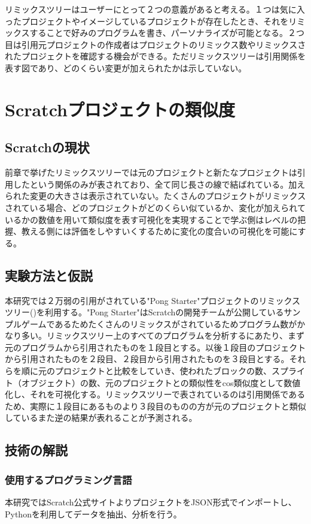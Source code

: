 \documentclass[a4paper,10pt,onecolumn,oneside,openany]{jsbook}
\begin{document}
リミックスツリーはユーザーにとって２つの意義があると考える。１つは気に入ったプロジェクトやイメージしているプロジェクトが存在したとき、それをリミックスすることで好みのプログラムを書き、パーソナライズが可能となる。２つ目は引用元プロジェクトの作成者はプロジェクトのリミックス数やリミックスされたプロジェクトを確認する機会ができる。ただリミックスツリーは引用関係を表す図であり、どのくらい変更が加えられたかは示していない。



\chapter{Scratchプロジェクトの類似度}
\section{Scratchの現状}
前章で挙げたリミックスツリーでは元のプロジェクトと新たなプロジェクトは引用したという関係のみが表されており、全て同じ長さの線で結ばれている。加えられた変更の大きさは表示されていない。たくさんのプロジェクトがリミックスされている場合、どのプロジェクトがどのくらい似ているか、変化が加えられているかの数値を用いて類似度を表す可視化を実現することで学ぶ側はレベルの把握、教える側には評価をしやすいくするために変化の度合いの可視化を可能にする。
 \section{実験方法と仮説}
本研究では２万弱の引用がされている"Pong Starter"プロジェクトのリミックスツリー(\cite{pongret})を利用する。"Pong Starter"はScratchの開発チームが公開しているサンプルゲームであるためたくさんのリミックスがされているためプログラム数がかなり多い。リミックスツリー上のすべてのプログラムを分析するにあたり、まず元のプログラムから引用されたものを１段目とする。以後１段目のプロジェクトから引用されたものを２段目、２段目から引用されたものを３段目とする。それらを順に元のプロジェクトと比較をしていき、使われたブロックの数、スプライト（オブジェクト）の数、元のプロジェクトとの類似性をcos類似度として数値化し、それを可視化する。リミックスツリーで表されているのは引用関係であるため、実際に１段目にあるものより３段目のものの方が元のプロジェクトと類似しているまた逆の結果が表れることが予測される。
\newpage
 \section{技術の解説}
\subsection{使用するプログラミング言語}
本研究ではScratch公式サイトよりプロジェクトをJSON形式でインポートし、Pythonを利用してデータを抽出、分析を行う。
\end{document}

